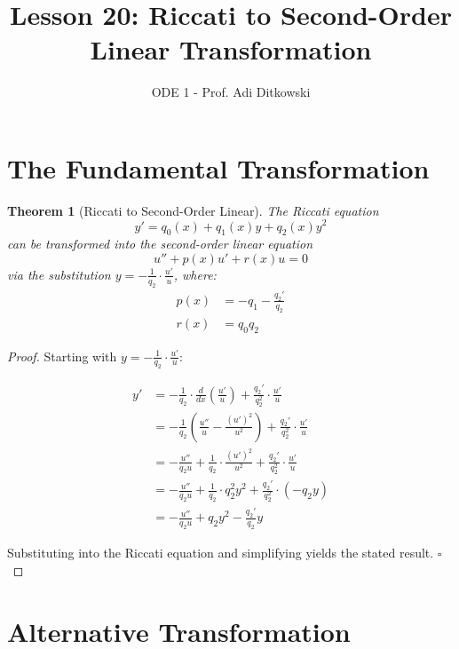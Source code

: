\documentclass[12pt]{article}
\title{Lesson 20: Riccati to Second-Order Linear Transformation}
\author{ODE 1 - Prof. Adi Ditkowski}
\date{}
\newtheorem{theorem}{Theorem}
\begin{document}
\maketitle

\section{The Fundamental Transformation}

\begin{theorem}[Riccati to Second-Order Linear]
The Riccati equation
$$y' = q_0(x) + q_1(x)y + q_2(x)y^2$$
can be transformed into the second-order linear equation
$$u'' + p(x)u' + r(x)u = 0$$
via the substitution $y = -\frac{1}{q_2} \cdot \frac{u'}{u}$, where:
\begin{align}
p(x) &= -q_1 - \frac{q_2'}{q_2} \\
r(x) &= q_0 q_2
\end{align}
\end{theorem}

\begin{proof}
Starting with $y = -\frac{1}{q_2} \cdot \frac{u'}{u}$:

\begin{align}
y' &= -\frac{1}{q_2} \cdot \frac{d}{dx}\left(\frac{u'}{u}\right) + \frac{q_2'}{q_2^2} \cdot \frac{u'}{u} \\
&= -\frac{1}{q_2}\left(\frac{u''}{u} - \frac{(u')^2}{u^2}\right) + \frac{q_2'}{q_2^2} \cdot \frac{u'}{u} \\
&= -\frac{u''}{q_2 u} + \frac{1}{q_2} \cdot \frac{(u')^2}{u^2} + \frac{q_2'}{q_2^2} \cdot \frac{u'}{u} \\
&= -\frac{u''}{q_2 u} + \frac{1}{q_2} \cdot q_2^2 y^2 + \frac{q_2'}{q_2^2} \cdot (-q_2 y) \\
&= -\frac{u''}{q_2 u} + q_2 y^2 - \frac{q_2'}{q_2} y
\end{align}

Substituting into the Riccati equation and simplifying yields the stated result. $\square$
\end{proof}

\section{Alternative Transformation}
\end{document}

